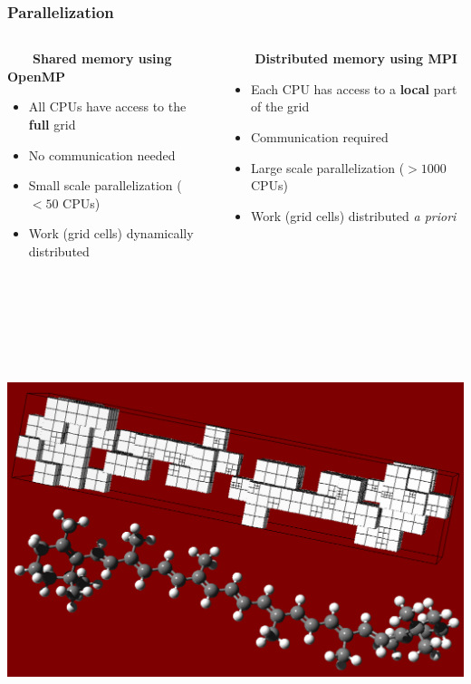 \documentclass[mathserif, 8pt]{beamer}
\begin{document}
\begin{frame}
    \frametitle{Parallelization}
    \begin{columns}
    \begin{column}{.5\textwidth}
	\ \ \ \ \textbf{Shared memory using OpenMP}
	\begin{itemize}
	    \item All CPUs have access to the \textbf{full} grid
	    \item No communication needed
	    \item Small scale parallelization ($<50$ CPUs)
	    \item Work (grid cells) dynamically distributed
	\end{itemize}
    \end{column}
    \begin{column}{.5\textwidth}
	\ \ \ \ \textbf{Distributed memory using MPI}
	\begin{itemize}
	    \item Each CPU has access to a \textbf{local} part of the grid
	    \item Communication required
	    \item Large scale parallelization ($>1000$ CPUs)
	    \item Work (grid cells) distributed \it{a priori}
	\end{itemize}
    \end{column}
    \end{columns}
    \ \\
    \ \\
    \ \\
    \ \\
    \begin{columns}
    \begin{column}{0.4\textwidth}
	\centering
	\includegraphics[angle=-90, scale=0.15]{figures/caroteneGrid.pdf}

\end{column}
\end{columns}
\end{frame}
\end{document}
